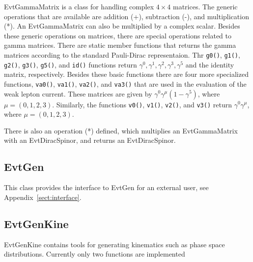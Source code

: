 EvtGammaMatrix is a class for handling 
complex $4\times 4$ matrices.
The generic operations that are available are 
addition (+), subtraction (-),
and multiplication (*). An EvtGammaMatrix can also
be multiplied by a complex scalar. 
Besides these
generic operations on matrices, there are special 
operations related to gamma matrices. There are
static member functions that returns the gamma matrices according
to the standard Pauli-Dirac representaion.
Thr {\tt g0()}, {\tt g1()}, {\tt g2()}, {\tt g3()}, {\tt g5()}, 
and {\tt id()} functions return
$\gamma^0,\gamma^1,\gamma^2,\gamma^3,\gamma^5$ and the identity matrix,
respectively. Besides these
basic functions there are four more specialized functions,
{\tt va0()}, {\tt va1()}, {\tt va2()}, and {\tt va3()} that are 
used in the evaluation of the
weak lepton current. These matrices are given by 
$\gamma^0\gamma^{\mu}(1-\gamma^5)$, where $\mu=(0,1,2,3)$.
Similarly, the functions {\tt v0()}, {\tt v1()}, {\tt v2()}, 
and {\tt v3()} return $\gamma^0\gamma^{\mu}$, where $\mu=(0,1,2,3)$.

There is also an operation (*) defined, which multiplies 
an EvtGammaMatrix with an EvtDiracSpinor, and returns an
EvtDiracSpinor. 


\subsection{EvtGen}


This class provides the interface to EvtGen for an external user,
see Appendix~\ref{sect:interface}.


\subsection{EvtGenKine}

EvtGenKine contains tools for generating kinematics such
as phase space distributions. Currently only two functions are
implemented

